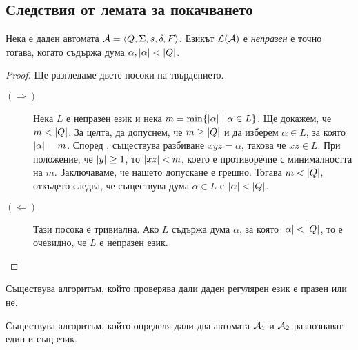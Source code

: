 \subsection*{Следствия от лемата за покачването}

\begin{prop}
  Нека е даден автомата $\mathcal{A} = \langle{Q,\Sigma,s,\delta,F}\rangle$.
  Езикът $\mathcal{L}(\mathcal{A})$ е {\em непразен} е точно тогава, когато съдържа дума $\alpha, \lvert{\alpha}\rvert < \lvert{Q}\rvert$.
\end{prop}
\begin{proof}
  Ще разгледаме двете посоки на твърдението.
  \begin{description}
  \item[$(\Rightarrow)$]
    Нека $L$ е непразен език и нека $m = \min\{\lvert{\alpha}\rvert \mid \alpha \in L\}$.
    Ще докажем, че $m < \lvert{Q}\rvert$.    
    За целта, да допуснем, че $m \geq \lvert{Q}\rvert$ и да изберем $\alpha \in L$, за която $\lvert{\alpha}\rvert = m$.
    Според , съществува разбиване $xyz = \alpha$, 
    такова че $xz \in L$.
    При положение, че $\lvert{y}\rvert \geq 1$, то $\lvert{xz}\rvert < m$, което 
    е противоречие с минималността на $m$.
    Заключаваме, че нашето допускане е грешно. Тогава $m < \lvert{Q}\rvert$, откъдето следва, че 
    съществува дума $\alpha \in L$ с $\lvert{\alpha}\rvert < \lvert{Q}\rvert$.
  \item[$(\Leftarrow)$]
    Тази посока е тривиална.
    Ако $L$ съдържа дума $\alpha$, за която $\lvert{\alpha}\rvert < \lvert{Q}\rvert$,
    то е очевидно, че $L$ е непразен език.
  \end{description}
\end{proof}

\begin{cor}
  Съществува алгоритъм, който проверява дали даден регулярен език е празен или не.
\end{cor}


\begin{cor}
  Съществува алгоритъм, който определя дали два автомата $\mathcal{A}_1$ и $\mathcal{A}_2$ разпознават един и същ език.
\end{cor}

